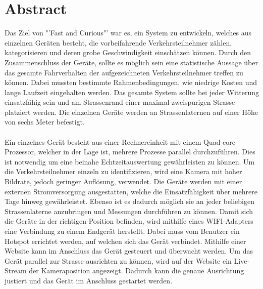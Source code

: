 \section{Abstract}
Das Ziel von "'Fast and Curious"' war es, ein System zu entwickeln, welches aus einzelnen Geräten besteht, die vorbeifahrende Verkehrsteilnehmer zählen, kategorisieren und deren grobe Geschwindigkeit einschätzen können. Durch den Zusammenschluss der Geräte, sollte es möglich sein eine statistische Aussage über das gesamte Fahrverhalten der aufgezeichneten Verkehrsteilnehmer treffen zu können. Dabei mussten bestimmte Rahmenbedingungen, wie niedrige Kosten und lange Laufzeit eingehalten werden. Das gesamte System sollte bei jeder Witterung einsatzfähig sein und am Strassenrand einer maximal zweispurigen Strasse platziert werden. Die einzelnen Geräte werden an Strassenlaternen auf einer Höhe von sechs Meter befestigt.\\\\
Ein einzelnes Gerät besteht aus einer Rechnereinheit mit einem Quad-core Prozessor, welcher in der Lage ist, mehrere Prozesse parallel durchzuführen. Dies ist notwendig um eine beinahe Echtzeitauswertung gewährleisten zu können. Um die Verkehrsteilnehmer einzeln zu identifizieren, wird eine Kamera mit hoher Bildrate, jedoch geringer Auflösung, verwendet. Die Geräte werden mit einer externen Stromversorgung ausgestatten, welche die Einsatzfähigkeit über mehrere Tage hinweg gewährleistet. Ebenso ist es dadurch möglich sie an jeder beliebigen Strassenlaterne anzubringen und Messungen durchführen zu können. Damit sich die Geräte in der richtigen Position befinden, wird mithilfe eines WIFI-Adapters eine Verbindung zu einem Endgerät herstellt. Dabei muss vom Benutzer ein Hotspot errichtet werden, auf welchen sich das Gerät verbindet. Mithilfe einer Website kann im Anschluss das Gerät gesteuert und überwacht werden. Um das Gerät parallel zur Strasse ausrichten zu können, wird auf der Website ein Live-Stream der Kameraposition angezeigt. Dadurch kann die genaue Ausrichtung justiert und das Gerät im Anschluss gestartet werden.\\\\
